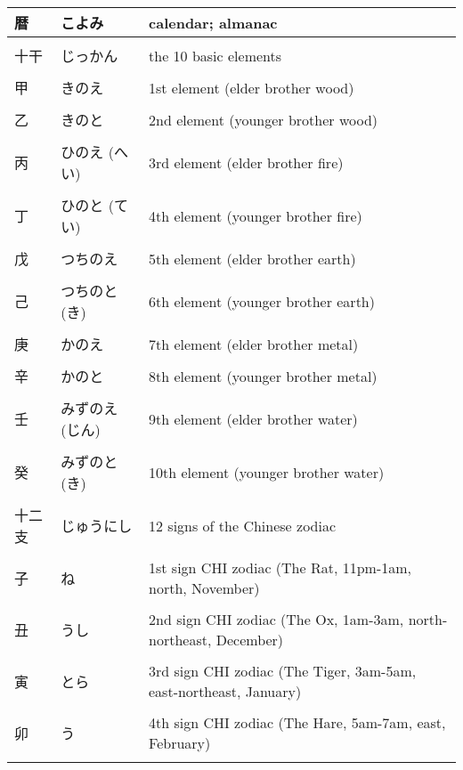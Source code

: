 \documentclass{article}
\begin{document}
\begin{tabular}{ l | l | p{10.5cm} }
暦		&こよみ		&calendar; almanac \\ \hline \\[-1em]
十干		&じっかん		&the 10 basic elements \\ \hline \\[-1em]
甲		&きのえ		&1st element (elder brother wood) \\ \hline \\[-1em]
乙		&きのと		&2nd element (younger brother wood)\\ \hline \\[-1em]
丙		&ひのえ (へい)		&3rd element (elder brother fire) \\ \hline \\[-1em]
丁		&ひのと (てい)		&4th element (younger brother fire) \\ \hline \\[-1em]
戊		&つちのえ		&5th element (elder brother earth) \\ \hline \\[-1em]
己		&つちのと (き)		&6th element (younger brother earth) \\ \hline \\[-1em]
庚		&かのえ		&7th element (elder brother metal) \\ \hline \\[-1em]
辛		&かのと		&8th element (younger brother metal) \\ \hline \\[-1em]
壬		&みずのえ (じん)	&9th element (elder brother water) \\ \hline \\[-1em]
癸		&みずのと (き)		&10th element (younger brother water) \\ \hline \\[-1em]
十二支		& じゅうにし 		&12 signs of the Chinese zodiac \\ \hline \\[-1em]
子		&ね		&1st sign CHI zodiac (The Rat, 11pm-1am, north, November) \\ \hline \\[-1em]
丑		&うし		&2nd sign CHI zodiac (The Ox, 1am-3am, north-northeast, December) \\ \hline \\[-1em]
寅		&とら		&3rd sign CHI zodiac (The Tiger, 3am-5am, east-northeast, January) \\ \hline \\[-1em]
卯		&う		&4th sign CHI zodiac (The Hare, 5am-7am, east, February) \\ \hline \\[-1em]

\end{tabular}
\end{document}
